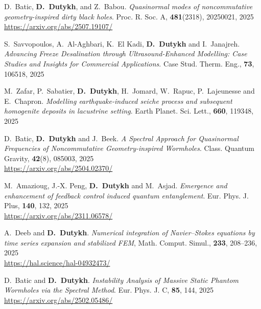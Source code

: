 \begin{etaremune}
  \item D.~Batic, \textbf{D.~Dutykh}, and Z.~Babou. \textit{Quasinormal modes of noncommutative geometry-inspired dirty black holes}. Proc. R. Soc. A, \textbf{481}(2318), 20250021, 2025 \\ %
  \url{https://arxiv.org/abs/2507.19107/}

  \item S.~Savvopoulos, A.~Al-Aghbari, K.~El Kadi, \textbf{D.~Dutykh} and I.~Janajreh. \textit{Advancing Freeze Desalination through Ultrasound-Enhanced Modelling: Case Studies and Insights for Commercial Applications}. Case Stud. Therm. Eng., \textbf{73}, 106518, 2025 %

  \item M.~Zafar, P.~Sabatier, \textbf{D.~Dutykh}, H.~Jomard, W.~Rapuc, P.~Lajeunesse and E.~Chapron. \textit{Modelling earthquake-induced seiche process and subsequent homogenite deposits in lacustrine setting}. Earth Planet. Sci. Lett., \textbf{660}, 119348, 2025 %

  \item D.~Batic, \textbf{D.~Dutykh} and J.~Beek. \textit{A Spectral Approach for Quasinormal Frequencies of Noncommutative Geometry-inspired Wormholes}. Class. Quantum Gravity, \textbf{42}(8), 085003, 2025 \\ %
  \url{https://arxiv.org/abs/2504.02370/}

  \item M.~Amazioug, J.-X. Peng, \textbf{D.~Dutykh} and M.~Asjad. \textit{Emergence and enhancement of feedback control induced quantum entanglement}. Eur. Phys. J. Plus, \textbf{140}, 132, 2025 \\ %
  \url{https://arxiv.org/abs/2311.06578/}

  \item A.~Deeb and \textbf{D.~Dutykh}. \textit{Numerical integration of Navier--Stokes equations by time series expansion and stabilized FEM}, Math. Comput. Simul., \textbf{233}, 208--236, 2025 \\ %
  \url{https://hal.science/hal-04932473/}

  \item D.~Batic and \textbf{D.~Dutykh}. \textit{Instability Analysis of Massive Static Phantom Wormholes via the Spectral Method}. Eur. Phys. J. C, \textbf{85}, 144, 2025 \\ %
  \url{https://arxiv.org/abs/2502.05486/}


\end{etaremune}
